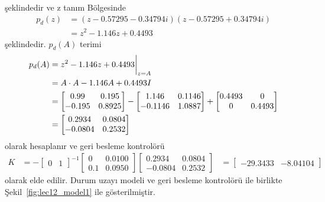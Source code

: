 şeklindedir ve z tanım Bölgesinde
\begin{equation}
    \begin{split}
        p_d(z)&=(z-0.57295-0.34794i)(z-0.57295+0.34794i)\\
        &=z^2 - 1.146z + 0.4493
    \end{split}
\end{equation}
şeklindedir. $p_d(A)$ terimi
\begin{equation}
    \begin{split}
        p_d(A)&=z^2 - 1.146z + 0.4493\bigg{|}_{z=A}\\
        &=A\cdot A - 1.146A + 0.4493I\\
        &=\begin{bmatrix} 0.99&0.195\\-0.195& 0.8925\end{bmatrix}-
        \begin{bmatrix}1.146&0.1146\\-0.1146&1.0887\end{bmatrix}+
        \begin{bmatrix}0.4493&0\\0&0.4493\end{bmatrix}\\
        &=\begin{bmatrix}0.2934&0.0804\\-0.0804&0.2532\end{bmatrix} 
    \end{split}
\end{equation}
olarak hesaplanır ve geri besleme kontrolörü
\begin{equation}
    \begin{split}
        K&=-\begin{bmatrix}0&1\end{bmatrix}^{-1}\begin{bmatrix}0& 0.0100\\0.1& 0.0950\end{bmatrix} \begin{bmatrix}0.2934&0.0804\\-0.0804&0.2532\end{bmatrix} 
        &=\begin{bmatrix}-29.3433& -8.04104\end{bmatrix} 
    \end{split}
\end{equation}
olarak elde edilir. Durum uzayı modeli ve geri besleme kontrolörü ile birlikte Şekil~\ref{fig:lec12_model1} ile gösterilmiştir. 

